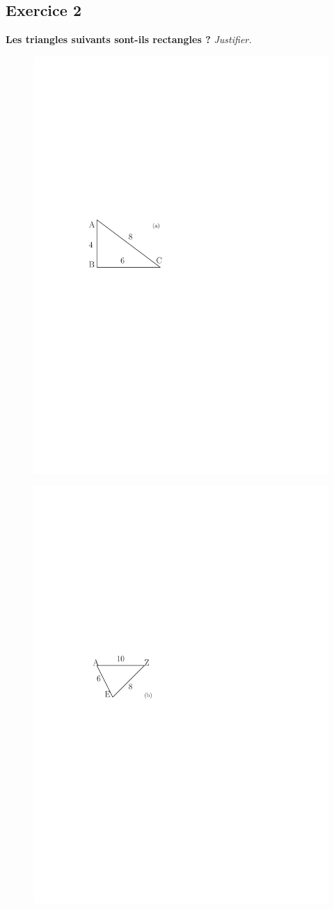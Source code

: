 \documentclass[12pt]{article}
\begin{document}
\begin{multicols}{3}

  \subsection*{Exercice 2}
  \textbf{Les triangles suivants sont-ils rectangles ?} \textit{Justifier.}
  
  \begin{figure}[H]
    \centering
    \includegraphics[width=0.7\linewidth]{sources/1/exo2-tri-1.pdf}
  \end{figure}

  \begin{figure}[H]
    \centering
    \includegraphics[width=0.7\linewidth]{sources/1/exo2-tri-2.pdf}
  \end{figure}

\end{multicols}
\end{document}
